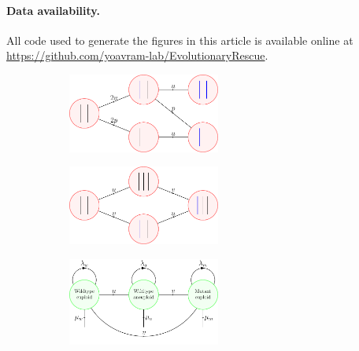 \documentclass[12pt]{extarticle}
\begin{document}

\paragraph{Data availability.} All code used to generate the figures in this article is available online at \href{https://github.com/yoavram-lab/EvolutionaryRescue}{https://github.com/yoavram-lab/EvolutionaryRescue}. 



\begin{figure}
\begin{subfigure}{\textwidth}
\centering
\includegraphics[width=0.55\textwidth]{Figures/figureAneuploidy1.pdf}
\caption{}
\end{subfigure}

\bigskip

\begin{subfigure}{\textwidth}
\centering
\includegraphics[width=0.55\textwidth]{Figures/figureAneuploidy2.pdf}
\caption{}
\end{subfigure}

\bigskip

\begin{subfigure}{\textwidth}
\centering
\includegraphics[width=0.55\textwidth]{Figures/figureAneuploidy3.pdf}
\caption{}
\label{figureAneuploidy}
\end{subfigure}


\end{figure}
\end{document}
